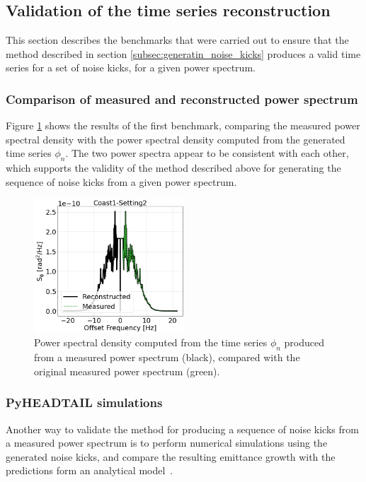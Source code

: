 \subsection{Validation of the time series reconstruction}
This section describes the benchmarks that were carried out to ensure that the method described in section \ref{subsec:generatin_noise_kicks} produces a valid time series for a set of noise kicks, for a given power spectrum. 

\subsubsection*{Comparison of measured and reconstructed power spectrum} %
Figure \ref{fig:generate_noise_kicks_sanity_check_1} shows the results of the first benchmark, comparing the measured power spectral density with the power spectral density computed from the generated time series $\phi_n$. The two power spectra appear to be consistent with each other, which supports the validity of the method described above for generating the sequence of noise kicks from a given power spectrum. 

\begin{figure}[!ht]
     \centering         
     \includegraphics[width=0.5\textwidth]{./images/app_B/coast1_setting2_Syy_original_vs_reconstructed_sanity_check.png}
         \caption{Power spectral density computed from the time series $\phi_n$ produced from a measured power spectrum (black), compared with the original measured power spectrum (green).}
         \label{fig:generate_noise_kicks_sanity_check_1}
\end{figure} 

\subsubsection*{PyHEADTAIL simulations} %
Another way to validate the method for producing a sequence of noise kicks from a measured power spectrum is to perform numerical simulations using the generated noise kicks, and compare the resulting emittance growth with the predictions form an analytical model~\cite{PhysRevSTAB.18.101001}.

